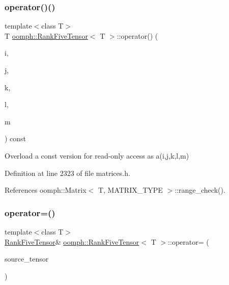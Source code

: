 \subsubsection{\texorpdfstring{operator()()}{operator()()}\hspace{0.1cm}{\footnotesize\ttfamily [2/2]}}
{\footnotesize\ttfamily template$<$class T$>$ \\
T \hyperlink{classoomph_1_1RankFiveTensor}{oomph\+::\+Rank\+Five\+Tensor}$<$ T $>$\+::operator() (\begin{DoxyParamCaption}\item[{const unsigned long \&}]{i,  }\item[{const unsigned long \&}]{j,  }\item[{const unsigned long \&}]{k,  }\item[{const unsigned long \&}]{l,  }\item[{const unsigned long \&}]{m }\end{DoxyParamCaption}) const\hspace{0.3cm}{\ttfamily [inline]}}



Overload a const version for read-\/only access as a(i,j,k,l,m) 



Definition at line 2323 of file matrices.\+h.



References oomph\+::\+Matrix$<$ T, M\+A\+T\+R\+I\+X\+\_\+\+T\+Y\+P\+E $>$\+::range\+\_\+check().

\mbox{\label{classoomph_1_1RankFiveTensor_a3972e47b50ce31ec0317862ce1e18884}} 
\subsubsection{\texorpdfstring{operator=()}{operator=()}}
{\footnotesize\ttfamily template$<$class T$>$ \\
\hyperlink{classoomph_1_1RankFiveTensor}{Rank\+Five\+Tensor}\& \hyperlink{classoomph_1_1RankFiveTensor}{oomph\+::\+Rank\+Five\+Tensor}$<$ T $>$\+::operator= (\begin{DoxyParamCaption}\item[{const \hyperlink{classoomph_1_1RankFiveTensor}{Rank\+Five\+Tensor}$<$ T $>$ \&}]{source\+\_\+tensor }\end{DoxyParamCaption})\hspace{0.3cm}{\ttfamily [inline]}}



